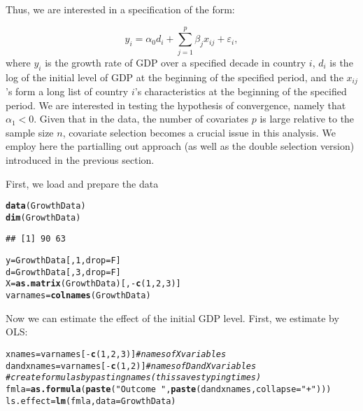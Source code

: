 \documentclass{amsart}\usepackage[]{graphicx}\usepackage[]{color}
\makeatletter
\newcommand{\hlnum}[1]{\textcolor[rgb]{0.686,0.059,0.569}{#1}}%
\newcommand{\hlstr}[1]{\textcolor[rgb]{0.192,0.494,0.8}{#1}}%
\newcommand{\hlcom}[1]{\textcolor[rgb]{0.678,0.584,0.686}{\textit{#1}}}%
\newcommand{\hlopt}[1]{\textcolor[rgb]{0,0,0}{#1}}%
\newcommand{\hlstd}[1]{\textcolor[rgb]{0.345,0.345,0.345}{#1}}%
\newcommand{\hlkwb}[1]{\textcolor[rgb]{0.69,0.353,0.396}{#1}}%
\newcommand{\hlkwc}[1]{\textcolor[rgb]{0.333,0.667,0.333}{#1}}%
\newcommand{\hlkwd}[1]{\textcolor[rgb]{0.737,0.353,0.396}{\textbf{#1}}}%
\newenvironment{kframe}{%
 \def\at@end@of@kframe{}%
 \ifinner\ifhmode%
  \def\at@end@of@kframe{\end{minipage}}%
  \begin{minipage}{\columnwidth}%
 \fi\fi%
 \def\FrameCommand##1{\hskip\@totalleftmargin \hskip-\fboxsep
 \colorbox{shadecolor}{##1}\hskip-\fboxsep
     \hskip-\linewidth \hskip-\@totalleftmargin \hskip\columnwidth}%
 \MakeFramed {\advance\hsize-\width
   \@totalleftmargin\z@ \linewidth\hsize
   \@setminipage}}%
 {\par\unskip\endMakeFramed%
 \at@end@of@kframe}
\newenvironment{knitrout}{}{} %
\makeatother
\begin{document}
Thus, we are interested in a specification of the form:

\[
\label{GrowthEq}
y_i = \alpha_0 d_i+ \sum_{j=1}^p \beta_j x_{ij} + \varepsilon_i, \]
where $y_i$ is the growth rate of GDP over a specified decade in country $i$, $d_i$ is the log of the
initial level of GDP at the beginning of the specified period, and the $x_{ij}$'s form a
long list of country $i$'s characteristics at the beginning of the specified period. We
are interested in testing the hypothesis of convergence, namely that $\alpha_1 < 0$.
Given that in the \citet{BarroLee1994} data, the number
of covariates $p$ is large relative to the sample size $n$,
covariate selection becomes a crucial issue in this analysis.
We employ here the partialling out approach (as well as the double selection version) introduced in the previous section.


First, we load and prepare the data

\begin{knitrout}
\color{fgcolor}\begin{kframe}
\begin{alltt}
\hlkwd{data}\hlstd{(GrowthData)}
\hlkwd{dim}\hlstd{(GrowthData)}
\end{alltt}
\begin{verbatim}
## [1] 90 63
\end{verbatim}
\begin{alltt}
\hlstd{y} \hlkwb{=} \hlstd{GrowthData[,} \hlnum{1}\hlstd{,} \hlkwc{drop} \hlstd{= F]}
\hlstd{d} \hlkwb{=} \hlstd{GrowthData[,} \hlnum{3}\hlstd{,} \hlkwc{drop} \hlstd{= F]}
\hlstd{X} \hlkwb{=} \hlkwd{as.matrix}\hlstd{(GrowthData)[,} \hlopt{-}\hlkwd{c}\hlstd{(}\hlnum{1}\hlstd{,} \hlnum{2}\hlstd{,} \hlnum{3}\hlstd{)]}
\hlstd{varnames} \hlkwb{=} \hlkwd{colnames}\hlstd{(GrowthData)}
\end{alltt}
\end{kframe}
\end{knitrout}

Now we can estimate the effect of the initial GDP level. First, we estimate by OLS:
\begin{knitrout}
\color{fgcolor}\begin{kframe}
\begin{alltt}
\hlstd{xnames} \hlkwb{=} \hlstd{varnames[}\hlopt{-}\hlkwd{c}\hlstd{(}\hlnum{1}\hlstd{,} \hlnum{2}\hlstd{,} \hlnum{3}\hlstd{)]}  \hlcom{# names of X variables}
\hlstd{dandxnames} \hlkwb{=} \hlstd{varnames[}\hlopt{-}\hlkwd{c}\hlstd{(}\hlnum{1}\hlstd{,} \hlnum{2}\hlstd{)]}  \hlcom{# names of D and X variables}
\hlcom{# create formulas by pasting names (this saves typing times)}
\hlstd{fmla} \hlkwb{=} \hlkwd{as.formula}\hlstd{(}\hlkwd{paste}\hlstd{(}\hlstr{"Outcome ~ "}\hlstd{,} \hlkwd{paste}\hlstd{(dandxnames,} \hlkwc{collapse} \hlstd{=} \hlstr{"+"}\hlstd{)))}
\hlstd{ls.effect} \hlkwb{=} \hlkwd{lm}\hlstd{(fmla,} \hlkwc{data} \hlstd{= GrowthData)}
\end{alltt}
\end{kframe}
\end{knitrout}
\end{document}
